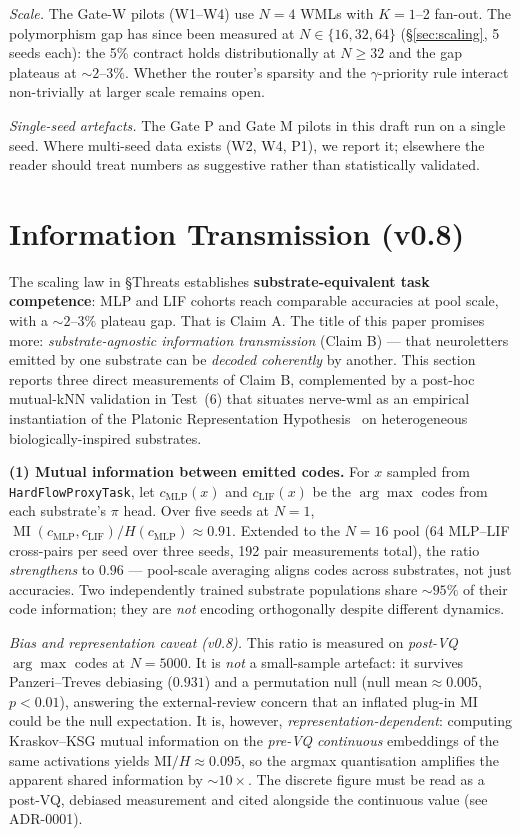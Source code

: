 \documentclass[10pt,twocolumn]{article}
\begin{document}
\textit{Scale.} The Gate-W pilots (W1--W4) use $N=4$ WMLs with $K=1$--2 fan-out. The polymorphism gap has since been measured at $N \in \{16, 32, 64\}$ (\S\ref{sec:scaling}, 5 seeds each): the 5\% contract holds distributionally at $N \geq 32$ and the gap plateaus at $\sim 2$--$3\%$. Whether the router's sparsity and the $\gamma$-priority rule interact non-trivially at larger scale remains open.

\textit{Single-seed artefacts.} The Gate P and Gate M pilots in this draft run on a single seed. Where multi-seed data exists (W2, W4, P1), we report it; elsewhere the reader should treat numbers as suggestive rather than statistically validated.

\section{Information Transmission (v0.8)}
\label{sec:info-tx}

The scaling law in \S Threats establishes \textbf{substrate-equivalent task competence}: MLP and LIF cohorts reach comparable accuracies at pool scale, with a $\sim 2\text{--}3\%$ plateau gap. That is Claim A. The title of this paper promises more: \emph{substrate-agnostic information transmission} (Claim B) --- that neuroletters emitted by one substrate can be \emph{decoded coherently} by another. This section reports three direct measurements of Claim B, complemented by a post-hoc mutual-kNN validation in Test~(6) that situates nerve-wml as an empirical instantiation of the Platonic Representation Hypothesis~\cite{huh2024platonic} on heterogeneous biologically-inspired substrates.

\textbf{(1) Mutual information between emitted codes.} For $x$ sampled from \texttt{HardFlowProxyTask}, let $c_{\text{MLP}}(x)$ and $c_{\text{LIF}}(x)$ be the $\arg\max$ codes from each substrate's $\pi$ head. Over five seeds at $N=1$, $\operatorname{MI}(c_{\text{MLP}}, c_{\text{LIF}}) / H(c_{\text{MLP}}) \approx 0.91$. Extended to the $N=16$ pool (64 MLP--LIF cross-pairs per seed over three seeds, 192 pair measurements total), the ratio \emph{strengthens} to $0.96$ --- pool-scale averaging aligns codes across substrates, not just accuracies. Two independently trained substrate populations share $\sim 95\%$ of their code information; they are \emph{not} encoding orthogonally despite different dynamics.

\emph{Bias and representation caveat (v0.8).} This ratio is measured on \emph{post-VQ} $\arg\max$ codes at $N=5000$. It is \emph{not} a small-sample artefact: it survives Panzeri--Treves debiasing ($0.931$) and a permutation null ($\text{null mean} \approx 0.005$, $p<0.01$), answering the external-review concern that an inflated plug-in MI could be the null expectation. It is, however, \emph{representation-dependent}: computing Kraskov--KSG mutual information on the \emph{pre-VQ continuous} embeddings of the same activations yields $\mathrm{MI}/H \approx 0.095$, so the argmax quantisation amplifies the apparent shared information by $\sim 10\times$. The discrete figure must be read as a post-VQ, debiased measurement and cited alongside the continuous value (see ADR-0001).
\end{document}
